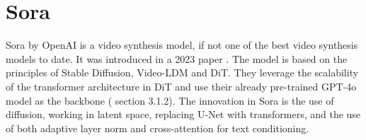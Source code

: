 \section{Sora}

Sora by OpenAI is a video synthesis model, if not one of the best video synthesis models to date. It was introduced in a 2023 paper \cite{sora}. The model is based on the principles of Stable Diffusion, Video-LDM and DiT. They leverage the scalability of the transformer architecture in DiT and use their already pre-trained GPT-4o model as the backbone (\cite{sun2024sora} section 3.1.2). The innovation in Sora is the use of diffusion, working in latent space, replacing U-Net with transformers, and the use of both adaptive layer norm and cross-attention for text conditioning.

